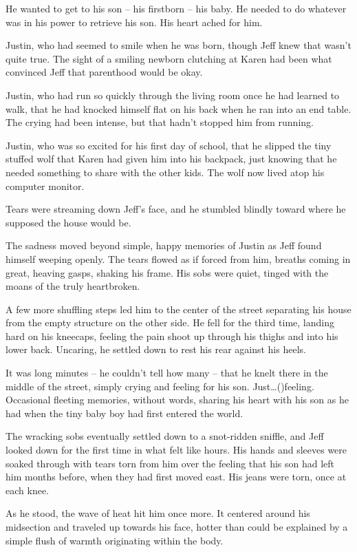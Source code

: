 He wanted to get to his son -- his firstborn -- his baby.  He needed to do whatever was in his power to retrieve his son.  His heart ached for him.

Justin, who had seemed to smile when he was born, though Jeff knew that wasn't quite true.  The sight of a smiling newborn clutching at Karen had been what convinced Jeff that parenthood would be okay.

Justin, who had run so quickly through the living room once he had learned to walk, that he had knocked himself flat on his back when he ran into an end table.  The crying had been intense, but that hadn't stopped him from running.

Justin, who was so excited for his first day of school, that he slipped the tiny stuffed wolf that Karen had given him into his backpack, just knowing that he needed something to share with the other kids.  The wolf now lived atop his computer monitor.

Tears were streaming down Jeff's face, and he stumbled blindly toward where he supposed the house would be.

The sadness moved beyond simple, happy memories of Justin as Jeff found himself weeping openly.  The tears flowed as if forced from him, breaths coming in great, heaving gasps, shaking his frame.  His sobs were quiet, tinged with the moans of the truly heartbroken.

A few more shuffling steps led him to the center of the street separating his house from the empty structure on the other side.  He fell for the third time, landing hard on his kneecaps, feeling the pain shoot up through his thighs and into his lower back.  Uncaring, he settled down to rest his rear against his heels.

It was long minutes -- he couldn't tell how many -- that he knelt there in the middle of the street, simply crying and feeling for his son.  Just\ldots()feeling.  Occasional fleeting memories, without words, sharing his heart with his son as he had when the tiny baby boy had first entered the world.

The wracking sobs eventually settled down to a snot-ridden sniffle, and Jeff looked down for the first time in what felt like hours.  His hands and sleeves were soaked through with tears torn from him over the feeling that his son had left him months before, when they had first moved east.  His jeans were torn, once at each knee.

As he stood, the wave of heat hit him once more.  It centered around his midsection and traveled up towards his face, hotter than could be explained by a simple flush of warmth originating within the body.

